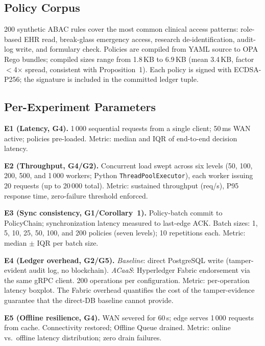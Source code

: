 \documentclass[runningheads]{llncs}
\begin{document}
\subsection*{Policy Corpus}

200 synthetic ABAC rules cover the most common clinical access patterns: role-based EHR read, break-glass emergency access, research de-identification, audit-log write, and formulary check. Policies are compiled from YAML source to OPA Rego bundles; compiled sizes range from 1.8\,KB to 6.9\,KB (mean 3.4\,KB, factor $<$4$\times$ spread, consistent with Proposition~1). Each policy is signed with ECDSA-P256; the signature is included in the committed ledger tuple.

\subsection*{Per-Experiment Parameters}

\noindent\textbf{E1 (Latency, G4).} 1\,000 sequential requests from a single client; 50\,ms WAN active; policies pre-loaded. Metric: median and IQR of end-to-end decision latency.

\noindent\textbf{E2 (Throughput, G4/G2).} Concurrent load swept across six levels (50, 100, 200, 500, and 1\,000 workers; Python \texttt{ThreadPoolExecutor}), each worker issuing 20 requests (up to 20\,000 total). Metric: sustained throughput (req/s), P95 response time, zero-failure threshold enforced.

\noindent\textbf{E3 (Sync consistency, G1/Corollary~1).} Policy-batch commit to PolicyChain; synchronization latency measured to last-edge ACK. Batch sizes: 1, 5, 10, 25, 50, 100, and 200 policies (seven levels); 10 repetitions each. Metric: median $\pm$ IQR per batch size.

\noindent\textbf{E4 (Ledger overhead, G2/G5).} \emph{Baseline}: direct PostgreSQL write (tamper-evident audit log, no blockchain). \emph{ACaaS}: Hyperledger Fabric endorsement via the same gRPC client. 200 operations per configuration. Metric: per-operation latency boxplot. The Fabric overhead quantifies the cost of the tamper-evidence guarantee that the direct-DB baseline cannot provide.

\noindent\textbf{E5 (Offline resilience, G4).} WAN severed for 60\,s; edge serves 1\,000 requests from cache. Connectivity restored; Offline Queue drained. Metric: online vs.\ offline latency distribution; zero drain failures.
\end{document}
